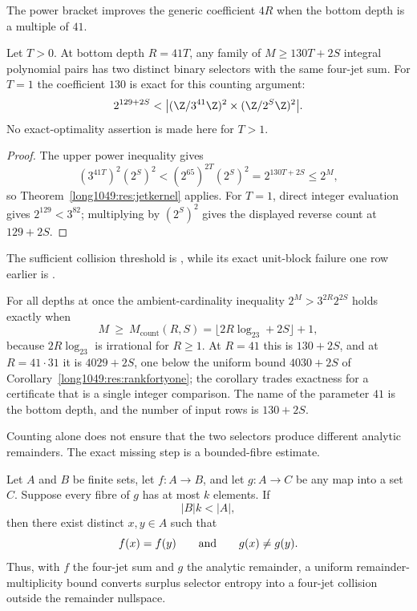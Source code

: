 \documentclass[11pt]{article}
\begin{document}
The power bracket improves the generic coefficient $4R$ when the bottom depth
is a multiple of $41$.

\begin{corollary}\label{long1049:res:rankfortyone}
Let $T>0$.  At bottom depth $R=41T$, any family of
$M\ge130T+2S$ integral polynomial pairs has two distinct binary selectors
with the same four-jet sum.  For $T=1$ the coefficient $130$ is exact for
this counting argument:
\[
 2^{129+2S}<\bigl| (\Z/3^{41}\Z)^2\times
                       (\Z/2^S\Z)^2\bigr|.
\]
No exact-optimality assertion is made here for $T>1$.
\end{corollary}

\begin{proof}
The upper power inequality gives
\[
 (3^{41T})^2(2^S)^2
 <(2^{65})^{2T}(2^S)^2=2^{130T+2S}\le2^M,
\]
so Theorem~\ref{long1049:res:jetkernel} applies.  For $T=1$, direct integer
evaluation gives $2^{129}<3^{82}$; multiplying by $(2^S)^2$ gives the
displayed reverse count at $129+2S$.
\end{proof}

\noindent The sufficient collision threshold is
,
while its exact unit-block failure one row earlier is
.

For all depths at once the ambient-cardinality inequality $2^{M}>3^{2R}2^{2S}$
holds exactly when
\[
 M\ \ge\ M_{\mathrm{count}}(R,S)=\bigl\lfloor2R\log_23+2S\bigr\rfloor+1,
\]
because $2R\log_23$ is irrational for $R\ge1$.  At $R=41$ this is $130+2S$, and
at $R=41\cdot31$ it is $4029+2S$, one below the uniform bound $4030+2S$ of
Corollary~\ref{long1049:res:rankfortyone}; the corollary trades exactness for a
certificate that is a single integer comparison.  The name of the parameter $41$
is the bottom depth, and the number of input rows is $130+2S$.

Counting alone does not ensure that the two selectors produce different
analytic remainders.  The exact missing step is a bounded-fibre estimate.

\begin{theorem}\label{long1049:res:boundedfibre}
Let $A$ and $B$ be finite sets, let $f:A\to B$, and let $g:A\to C$ be any
map into a set $C$.  Suppose every fibre of $g$ has at most $k$ elements.  If
\[
 |B|k<|A|,
\]
then there exist distinct $x,y\in A$ such that
\[
 f(x)=f(y)\qquad\hbox{and}\qquad g(x)\ne g(y).
\]
Thus, with $f$ the four-jet sum and $g$ the analytic remainder, a uniform
remainder-multiplicity bound converts surplus selector entropy into a
four-jet collision outside the remainder nullspace.
\end{theorem}
\end{document}
